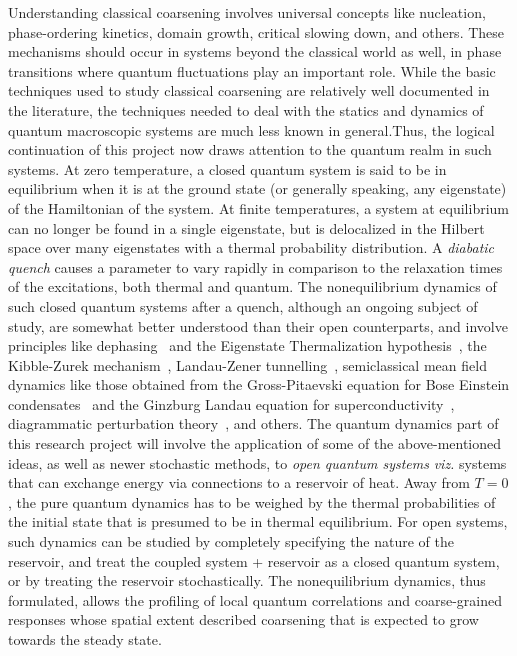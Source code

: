 \documentclass[a4paper,11pt,color]{article}
\begin{document}
\begin{enumerate}[label=(\alph*)]
Understanding classical coarsening involves universal concepts like nucleation, phase-ordering kinetics, domain growth, critical slowing down, and others. These mechanisms should occur in systems beyond the classical world as well, in phase transitions where quantum fluctuations play an important role. While the basic techniques used to study classical coarsening  are relatively well documented in the literature, the techniques needed to deal with the statics and dynamics of quantum macroscopic systems are much less known in general.Thus, the logical continuation of this project now draws attention to the quantum realm in such systems. At zero temperature, a closed quantum system is said to be in equilibrium when it is at the ground state (or generally speaking, any eigenstate) of the Hamiltonian of the system. At finite temperatures, a system at equilibrium can no longer be found in a single eigenstate, but is delocalized in the Hilbert space over many eigenstates with a thermal probability distribution. A \textit{diabatic quench} causes a  {parameter} to vary rapidly in comparison to the relaxation times of the excitations, both thermal and quantum. The nonequilibrium dynamics of such closed quantum systems after a quench, although an ongoing subject of study,  {are somewhat better understood than their open counterparts}, and involve principles like dephasing~\cite{thermalization} 
and the Eigenstate Thermalization hypothesis~\cite{thermalization,krishrev}, the Kibble-Zurek mechanism~\cite{bikashbabu}, Landau-Zener tunnelling~\cite{bikashbabu}, semiclassical mean field dynamics like those obtained from the Gross-Pitaevski equation for Bose Einstein condensates~\cite{colrev} and the Ginzburg Landau equation for superconductivity~\cite{rammer}, diagrammatic perturbation theory~\cite{gorkov, volkov}, and others. The quantum dynamics part of this research project will involve the application of some of the above-mentioned ideas, as well as newer stochastic methods, to \textit{open quantum systems} \textit{viz.} systems that can exchange energy via connections to a reservoir of heat. Away from $T=0$, the pure quantum dynamics has to be weighed by the thermal probabilities of the initial state that is presumed to be in thermal equilibrium. For open systems, such dynamics can be studied by completely specifying the nature of the reservoir, and treat the coupled system + reservoir as a closed 
quantum system, or by treating the reservoir stochastically. The nonequilibrium dynamics, thus formulated, allows the profiling of local quantum correlations and coarse-grained responses whose 
spatial extent described coarsening that is expected to grow towards the steady state. 




\end{enumerate}
\end{document}
